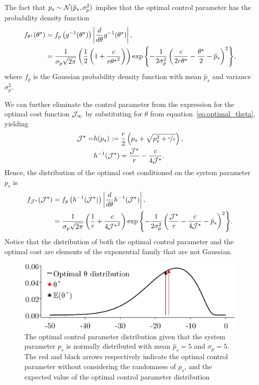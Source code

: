 %
The fact that $p_s \sim \mathcal{N}(\hat{p}_s, \sigma_p^2)$ implies that the optimal
control parameter has the probability density function
%
\begin{align*} 
    f_{\theta^\star}(\theta^\star) &= f_p\left(g^{-1}(\theta^\star)\right)
        \left|{\frac{d}{d\theta}g^{-1}(\theta^\star)}\right|, \\ 
        &= \frac{1}{\sigma_p
        \sqrt{2\pi}}\left(\frac{1}{2}\left(1+\frac{c}{r{\theta^\star}^2}\right)\right)
        \exp{\left\{-\frac{1}{2\sigma_p^2}\left(
        \frac{c}{2r\theta^\star} - \frac{\theta^\star}{2} - \hat{p}_s
        \right)^2\right\}}, 
\end{align*}
%
where $f_p$ is the Gaussian probability density function with mean $\hat{p}_s$ and
variance $\sigma_p^2$. 

We can further eliminate the control parameter from the
expression for the optimal cost function $\mathcal{J}_\infty$ by
substituting for $\theta$ from
equation~\eqref{eq:optimal_theta}, yielding 
%
\begin{align*}
\mathcal{J}^\star = &h(p_s) := \frac{r}{2}\left( p_s +
\sqrt{p_s^2 + \nicefrac{c}{r}} \right), \\
&h^{-1}(\mathcal{J}^\star) = \frac{\mathcal{J}^\star}{r} -
\frac{c}{4\mathcal{J}^\star}.
\end{align*}
%
Hence, the distribution of the optimal cost conditioned on the system parameter
$p_s$ is 
%
\begin{align*} 
    f_{\mathcal{J}^\star}(\mathcal{J}^\star) &=f_p\left(h^{-1}(\mathcal{J}^\star)\right)
        \left|{\frac{d}{d\theta}h^{-1}(\mathcal{J}^\star)}\right|, \\
        &= \frac{1}{\sigma_p
        \sqrt{2\pi}}\left(\frac{1}{r} + \frac{c}{4{\mathcal{J}^\star}^2}\right)
        \exp{\left\{ -\frac{1}{2\sigma_p^2} \left(
        \frac{\mathcal{J}^\star}{r} - \frac{c}{4\mathcal{J}^\star} -
        \hat{p}_s\right)^2\right\}}.
\end{align*}
%
Notice that the distribution of both the optimal control parameter and the
optimal cost are elements of the exponential family that are not Gaussian. 

\begin{figure}[tb]
  \centering
  \includegraphics[width=0.7\linewidth]{./figures/optimal-dist.eps}
  \caption{The optimal control parameter distribution given that the system
  parameter $p_s$ is normally distributed with mean $\hat{p}_s = 5$ and $\sigma_p
  = 5$. The red and black arrows respectively indicate the optimal control
  parameter without considering the randomness of $p_s$, and the expected value
  of the optimal control parameter distribution}
  \label{fig:optimal_dist}
\end{figure}



